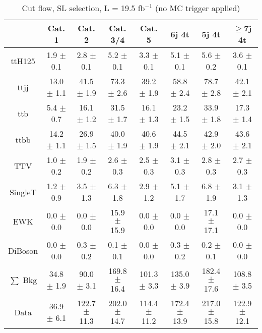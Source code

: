 \documentclass{article}
\begin{document}
        \begin{table*}[htbp]
        \begin{center}
\label{tab:cutflow}
\begin{tabular}{| c| c| c| c| c| c| c| c| }
\hline
 & Cat. 1  & Cat. 2  & Cat. 3/4  & Cat. 5  & 6j 4t  & 5j 4t  & $\ge$7j 4t \\ \hline
ttH125 &  1.9 $\pm$ 0.1  &  2.8 $\pm$ 0.1  &  5.2 $\pm$ 0.1  &  3.3 $\pm$ 0.1  &  5.1 $\pm$ 0.1  &  5.6 $\pm$ 0.2  &  3.6 $\pm$ 0.1 \\
ttjj &  13.0 $\pm$ 1.1  &  41.5 $\pm$ 1.9  &  73.3 $\pm$ 2.6  &  39.2 $\pm$ 1.9  &  58.8 $\pm$ 2.4  &  78.7 $\pm$ 2.8  &  42.1 $\pm$ 2.1 \\
ttb &  5.4 $\pm$ 0.7  &  16.1 $\pm$ 1.2  &  31.5 $\pm$ 1.7  &  16.1 $\pm$ 1.3  &  23.2 $\pm$ 1.5  &  33.9 $\pm$ 1.8  &  17.3 $\pm$ 1.4 \\
ttbb &  14.2 $\pm$ 1.1  &  26.9 $\pm$ 1.5  &  40.0 $\pm$ 1.9  &  40.6 $\pm$ 1.9  &  44.5 $\pm$ 2.1  &  42.9 $\pm$ 2.0  &  43.6 $\pm$ 2.1 \\
TTV &  1.0 $\pm$ 0.2  &  1.9 $\pm$ 0.2  &  2.6 $\pm$ 0.3  &  2.5 $\pm$ 0.3  &  3.1 $\pm$ 0.3  &  2.8 $\pm$ 0.3  &  2.7 $\pm$ 0.3 \\
SingleT &  1.2 $\pm$ 0.9  &  3.5 $\pm$ 1.3  &  6.3 $\pm$ 1.8  &  2.9 $\pm$ 1.2  &  5.1 $\pm$ 1.7  &  6.8 $\pm$ 1.9  &  3.1 $\pm$ 1.3 \\
EWK &  0.0 $\pm$ 0.0  &  0.0 $\pm$ 0.0  &  15.9 $\pm$ 15.9  &  0.0 $\pm$ 0.0  &  0.0 $\pm$ 0.0  &  17.1 $\pm$ 17.1  &  0.0 $\pm$ 0.0 \\
DiBoson &  0.0 $\pm$ 0.0  &  0.3 $\pm$ 0.2  &  0.1 $\pm$ 0.1  &  0.0 $\pm$ 0.0  &  0.3 $\pm$ 0.2  &  0.2 $\pm$ 0.1  &  0.0 $\pm$ 0.0 \\
\hline
$\sum$ Bkg &  34.8 $\pm$ 1.9  &  90.0 $\pm$ 3.1  &  169.8 $\pm$ 16.4  &  101.3 $\pm$ 3.3  &  135.0 $\pm$ 3.9  &  182.4 $\pm$ 17.6  &  108.8 $\pm$ 3.5 \\
\hline
Data &  36.9 $\pm$ 6.1  &  122.7 $\pm$ 11.3  &  202.0 $\pm$ 14.7  &  114.4 $\pm$ 11.2  &  172.4 $\pm$ 13.9  &  217.0 $\pm$ 15.8  &  122.9 $\pm$ 12.1 \\
\hline

        \end{tabular}

\caption{Cut flow, SL selection,   L = 19.5 fb$^{-1}$  (no MC trigger applied)  }
   
     \end{center}
        \end{table*}

        
\end{document}
